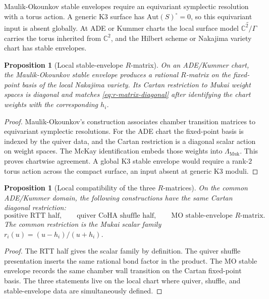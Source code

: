 \documentclass[11pt]{article}
\newtheorem{proposition}[theorem]{Proposition}
\theoremstyle{definition}
\newcommand{\C}{\mathbb{C}}
\newcommand{\Lmuk}{\Lambda_{\mathrm{Muk}}}
\newcommand{\Aut}{\mathrm{Aut}}
\begin{document}
Maulik-Okounkov stable envelopes require an equivariant symplectic
resolution with a torus action. A generic K3 surface has
$\Aut(S)^\circ=0$, so this equivariant input is absent globally. At ADE
or Kummer charts the local surface model
$\widetilde{\C^2/\Gamma}$ carries the torus inherited from $\C^2$, and
the Hilbert scheme or Nakajima variety chart has stable envelopes.

\begin{proposition}[Local stable-envelope $R$-matrix]
\label{prop:mo-at-ade}
On an ADE/Kummer chart, the Maulik-Okounkov stable envelope produces a
rational $R$-matrix on the fixed-point basis of the local Nakajima
variety. Its Cartan restriction to Mukai weight spaces is diagonal and
matches \eqref{eq:r-matrix-diagonal} after identifying the chart weights
with the corresponding $h_i$.
\end{proposition}

\begin{proof}
Maulik-Okounkov's construction associates chamber transition matrices to
equivariant symplectic resolutions. For the ADE chart the fixed-point
basis is indexed by the quiver data, and the Cartan restriction is a
diagonal scalar action on weight spaces. The McKay identification embeds
those weights into $\Lmuk$. This proves chartwise agreement. A global K3
stable envelope would require a rank-$2$ torus action across the compact
surface, an input absent at generic K3 moduli.
\end{proof}

\begin{proposition}[Local compatibility of the three $R$-matrices]
\label{prop:three-routes}
On the common ADE/Kummer domain, the following constructions have the
same Cartan diagonal restriction:
\[
  \text{positive RTT half},\qquad
  \text{quiver CoHA shuffle half},\qquad
  \text{MO stable-envelope }R\text{-matrix}.
\]
The common restriction is the Mukai scalar family
$r_i(u)=(u-h_i)/(u+h_i)$.
\end{proposition}

\begin{proof}
The RTT half gives the scalar family by definition. The quiver shuffle
presentation inserts the same rational bond factor in the product. The
MO stable envelope records the same chamber wall transition on the
Cartan fixed-point basis. The three statements live on the local chart
where quiver, shuffle, and stable-envelope data are simultaneously
defined.
\end{proof}
\end{document}
